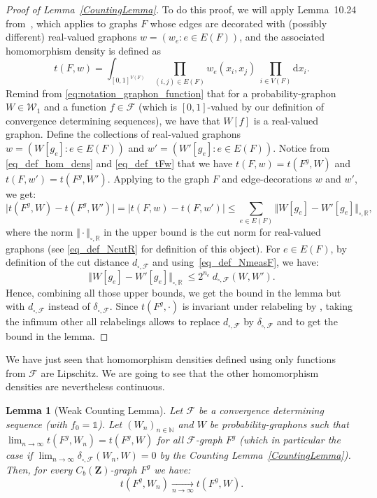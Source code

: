 \documentclass{amsart}
\theoremstyle{plain}
\newtheorem{lemme}[Th]{Lemma}
\theoremstyle{definition}
\newcommand{\Space}{\mathbf{Z}}
\newcommand{\CbFunct}{C_b(\Space)}
\newcommand{\Graphon}{\mathcal{W}_1}
\newcommand{\NcutR}[1]{\Vert#1\Vert_{\square,\R}}
\newcommand{\NcutRSymbol}{\Vert\cdot\Vert_{\square,\R}}
\newcommand{\dcutF}{d_{\square,\mathcal{F}}}
\newcommand{\ddcutF}{\delta_{\square,\mathcal{F}}}
\newcommand{\F}{\mathcal{F}}
\newcommand{\un}{\mathds{1}}
\newcommand{\N}{\mathbb{N}}
\newcommand{\R}{\mathbb{R}}
\newcommand{\drv}{\mathrm{d}}
\begin{document}
\begin{proof}[Proof of Lemma~\ref{CountingLemma}]
To do this proof, we will apply Lemma~10.24 from~\cite{Lovasz},
which applies to graphs $F$ whose
edges are decorated with (possibly different)
real-valued graphons $w = (w_e : e\in E(F))$,
and the associated homomorphism density is defined as
\begin{equation}\label{eq_def_tFw}
t(F,w) = \int_{[0,1]^{V(F)}} \prod_{(i,j)\in E(F)} w_e(x_i,x_j)\ 
		\prod_{i\in V(F)} \drv x_i  .
\end{equation}
Remind from \eqref{eq:notation_graphon_function}
that for a probability-graphon $W\in\Graphon$
and a function $f\in\F$ (which is $[0,1]$-valued
	by our definition of convergence determining sequences),
we have that $W[f]$ is a real-valued graphon.
Define the collections of real-valued graphons
$w = (W[g_e] : e\in E(F) )$
and $w' = (W'[g_e] : e\in E(F) )$.
Notice from \eqref{eq_def_hom_dens} and \eqref{eq_def_tFw}
that we have $t(F,w) = t(F^g,W)$
	and $t(F,w') = t(F^g,W')$.
Applying \cite[Lemma~10.24]{Lovasz}
to the graph $F$ 
and edge-decorations $w$ and $w'$,
we get:
\[ 
\vert t(F^g,W) - t(F^g,W') \vert
= \vert t(F,w) - t(F,w') \vert 
\leq \sum_{e\in E(F)} \NcutR{W[g_e] - W'[g_e]}  ,
\]
where the norm $\NcutRSymbol$ in the upper bound
is the cut norm for real-valued graphons
	(see \eqref{eq_def_NcutR} for definition of this object). 
For $e\in E(F)$,
by definition of the cut distance $\dcutF$
and using~\eqref{eq_def_NmeasF},
we have:
\[ \NcutR{W[g_e] - W'[g_e]}\ \leq 2^{n_e}\  \dcutF(W, W')  . \]
Hence, combining all those upper bounds,
we get the bound in the lemma
but with $\dcutF$ instead of $\ddcutF$.
Since  $t(F^g,\cdot)$ is invariant under relabeling by , 
taking the infimum other all relabelings allows
to replace $\dcutF$ by $\ddcutF$ and to get the bound in the lemma.
\end{proof}


We have just seen that homomorphism densities defined using only
functions from $\F$ are Lipschitz.
We are going to see that the other homomorphism densities
are nevertheless continuous.
 

\begin{lemme}[Weak Counting Lemma]\label{WeakCountingLemma} 
Let $\F$ be a convergence determining sequence
	(with $f_0 = \un$).
Let $(W_n )_{n\in\N}$ and $W$ be probability-graphons
such that $\lim_{n\to\infty}t(F^g,W_n) = t(F^g,W)$  for all $\F$-graph $F^g$ (which in particular the case if
$\lim_{n\to\infty} \ddcutF(W_n,W) = 0$ by the  Counting Lemma~\ref{CountingLemma}). 
Then, for every $\CbFunct$-graph $F^g$ 
we have:
\[ t(F^g,W_n) \underset{n\to\infty}{\longrightarrow} t(F^g,W)  . \]
\end{lemme}
\end{document}
